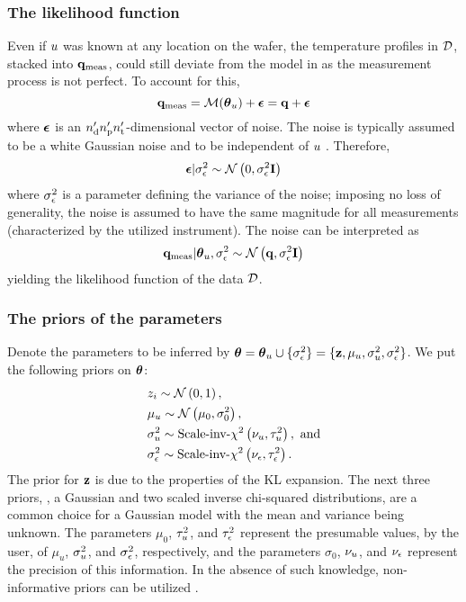 \subsubsection{The likelihood function}
Even if $u$ was known at any location on the wafer, the temperature profiles in $\mathcal{D}$, stacked into $\mathbf{q}_{\text{meas}}$, could still deviate from the model in  as the measurement process is not perfect. To account for this,
\[
  \mvT_\meas = \model{\vparam_\u} + \vnoise = \mvT + \vnoise
\]
where $\boldsymbol\epsilon$ is an ${n_\text{d}'} {n_\text{p}'} {n_\text{t}'}$-dimensional vector of noise. The noise is typically assumed to be a white Gaussian noise and to be independent of $u$ \cite{rasmussen2006, marzouk2009}. Therefore,
\[
  \boldsymbol\epsilon | \sigma^2_\epsilon \sim \mathcal{N}\left( 0, \sigma^2_\epsilon \mathbf{I} \right)
\]
where $\sigma^2_\epsilon$ is a parameter defining the variance of the noise; imposing no loss of generality, the noise is assumed to have the same magnitude for all measurements (characterized by the utilized instrument). The noise can be interpreted as
\begin{equation} \elabel{likelihood}
  \mvT_\meas | \vparam_\u, \sigma_\noise^2 \sim \gaussian{\mvT}{\sigma_\noise^2 \mI}
\end{equation}
yielding the likelihood function of the data $\mathcal{D}$.

\subsubsection{The priors of the parameters}
Denote the parameters to be inferred by ${\boldsymbol\theta} = {\boldsymbol\theta}_u \cup \{ \sigma_\epsilon^2 \} = \{ \mathbf{z}, \mu_u, \sigma_u^2, \sigma_\epsilon^2 \}$. We put the following priors on ${\boldsymbol\theta}$:
\begin{align}
  & \z_i \sim \gaussian{0}{1}, \elabel{z-prior} \\
  & \mu_\u \sim \gaussian{\mu_0}{\sigma^2_0}, \elabel{mu-u-prior} \\
  & \sigma^2_\u \sim \sichisquared{\nu_\u}{\tau^2_\u}, \text{ and} \elabel{sigma2-u-prior} \\
  & \sigma^2_\noise \sim \sichisquared{\nu_\noise}{\tau^2_\noise}. \elabel{sigma2-noise-prior}
\end{align}
The prior for $\mathbf{z}$ is due to the properties of the KL expansion. The next three priors, \ie, a Gaussian and two scaled inverse chi-squared distributions, are a common choice for a Gaussian model with the mean and variance being unknown. The parameters $\mu_0$, $\tau^2_u$, and $\tau^2_\epsilon$ represent the presumable values, by the user, of $\mu_u$, $\sigma^2_u$, and $\sigma^2_\epsilon$, respectively, and the parameters $\sigma_0$, $\nu_u$, and $\nu_\epsilon$ represent the precision of this information. In the absence of such knowledge, non-informative priors can be utilized \cite{gelman2004, bernardo2007}.

